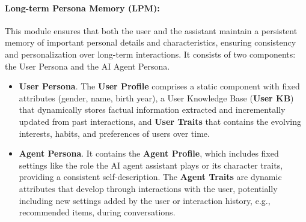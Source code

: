 \documentclass[11pt]{article}
\begin{document}
\paragraph{Long-term Persona Memory (LPM):} 
This module ensures that both the user and the assistant maintain a persistent memory of important personal details and characteristics, ensuring consistency and personalization over long-term interactions.
It consists of two components: the User Persona and the AI Agent Persona. 
\begin{itemize}
\item \textbf{User Persona}.
The \textbf{User Profile} comprises a static component with fixed attributes (gender, name, birth year), a User Knowledge Base (\textbf{User KB}) that dynamically stores factual information extracted and incrementally updated from past interactions, and \textbf{User Traits} that contains the evolving interests, habits, and preferences of users over time.

\item \textbf{Agent Persona}. It contains the \textbf{Agent Profile}, which includes fixed settings like the role the AI agent assistant plays or its character traits, providing a consistent self-description.
The \textbf{Agent Traits} are dynamic attributes that develop through interactions with the user, potentially including new settings added by the user or interaction history, e.g., recommended items, during conversations.
\end{itemize}

\end{document}
